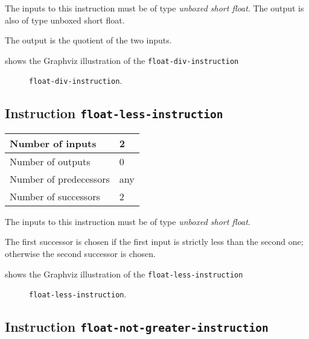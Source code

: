 The inputs to this instruction must be of type \emph{unboxed short
  float}. The output is also of type unboxed short float.

The output is the quotient of the two inputs.

 shows the Graphviz illustration of the
\texttt{float-div-instruction}

\begin{figure}
\begin{center}
\end{center}
\caption{\label{fig-float-div-instruction}
\texttt{float-div-instruction}.}
\end{figure}

\subsection{Instruction \texttt{float-less-instruction}}
\label{mir-instruction-float-less}

\begin{tabular}{|l|l|}
\hline
Number of inputs & 2\\
\hline
Number of outputs & 0\\
\hline
Number of predecessors & any\\
\hline
Number of successors & 2\\
\hline
\end{tabular}

The inputs to this instruction must be of type \emph{unboxed short
  float}.

The first successor is chosen if the first input is strictly less than
the second one; otherwise the second successor is chosen. 

 shows the Graphviz illustration of the
\texttt{float-less-instruction}

\begin{figure}
\begin{center}
\end{center}
\caption{\label{fig-float-less-instruction}
\texttt{float-less-instruction}.}
\end{figure}

\subsection{Instruction \texttt{float-not-greater-instruction}}
\label{mir-instruction-float-not-greater}

